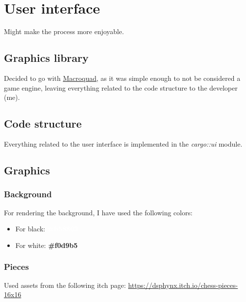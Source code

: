 

\section{User interface}

Might make the process more enjoyable.

\subsection{Graphics library}

Decided to go with \href{https://macroquad.rs/}{Macroquad}, as it was simple enough to not be considered a game engine,
leaving everything related to the code structure to the developer (me).

\subsection{Code structure}

Everything related to the user interface is implemented in the \textit{cargo::ui} module.

\subsection{Graphics}

\subsubsection{Background}

For rendering the background, I have used the following colors:

\begin{itemize}
    \item For black: \colorbox{myblack}{\textcolor{white}{\textbf{\#b58863}}}
    \item For white: \colorbox{mywhite}{\textbf{\#f0d9b5}}
\end{itemize}

\subsubsection{Pieces}

Used assets from the following itch page: \url{https://dsphynx.itch.io/chess-pieces-16x16}